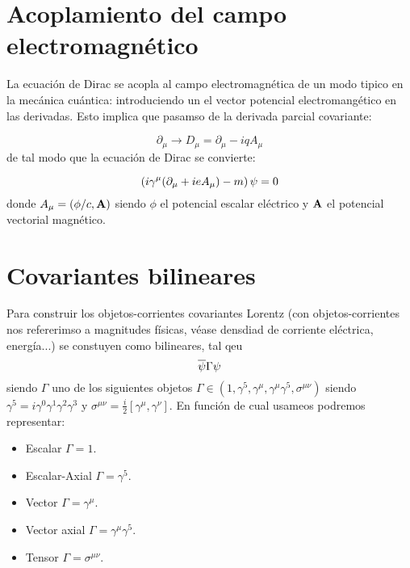 \section{Acoplamiento del campo electromagnético}

La ecuación de Dirac se acopla al campo electromagnética de un modo tipico en la mecánica cuántica: introduciendo un el vector potencial electromangético en las derivadas. Esto implica que pasamso de la derivada parcial covariante:

\begin{equation}
    \partial_\mu \to D_\mu = \partial_\mu - i q A_\mu
\end{equation}
de tal modo que la ecuación de Dirac se convierte:

\begin{equation}
    \left( i \gamma^\mu (\partial_\mu + i e A_\mu) - m \right) \psi = 0
\end{equation}
donde $A_\mu=\left( \phi/c, \mathbf{A} \right)$ siendo $\phi$ el potencial escalar eléctrico y $\mathbf{A}$ el potencial vectorial magnético. 

\section{Covariantes bilineares}

Para construir los objetos-corrientes covariantes Lorentz (con objetos-corrientes nos refererimso a magnitudes físicas, véase densdiad de corriente eléctrica, energía...) se constuyen como bilineares, tal qeu
\begin{equation}
    \overline{\psi} \Gamma \psi
\end{equation}
siendo $\Gamma$ uno de los siguientes objetos $\Gamma \in (1,\gamma^5, \gamma^\mu, \gamma^\mu \gamma^5, \sigma^{\mu\nu})$ siendo $\gamma^5 = i \gamma^0 \gamma^1 \gamma^2 \gamma^3$ y $\sigma^{\mu\nu} = \frac{i}{2} [\gamma^\mu, \gamma^\nu]$. En función de cual usameos podremos representar:

\begin{itemize}
    \item Escalar $\Gamma=1$.
    \item Escalar-Axial $\Gamma=\gamma^5$.
    \item Vector $\Gamma=\gamma^\mu$.
    \item Vector axial $\Gamma=\gamma^\mu \gamma^5$.
    \item Tensor $\Gamma=\sigma^{\mu\nu}$.
\end{itemize}

